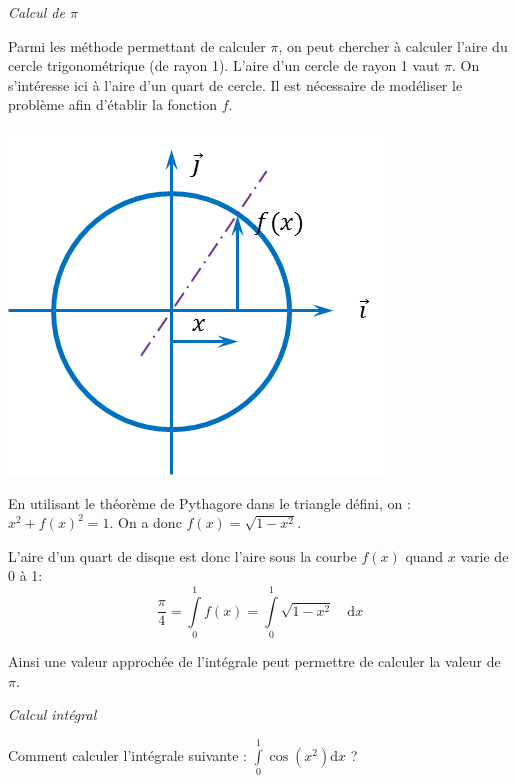 \documentclass[10pt]{article}
\begin{document}
\begin{exemple}
\textit{Calcul de $\pi$}

\begin{minipage}[c]{.6\linewidth}
Parmi les méthode permettant de calculer $\pi$, on peut chercher à calculer l'aire du cercle trigonométrique (de rayon 1). L'aire d'un cercle de rayon 1 vaut $\pi$. On s'intéresse ici à l'aire d'un quart de cercle. Il est nécessaire de modéliser le problème afin d'établir la fonction $f$.

\end{minipage}\hfill
\begin{minipage}[c]{.35\linewidth}
\begin{center}
\includegraphics[width=.95\textwidth]{images/cercle}
\end{center}
\end{minipage}

En utilisant le théorème de Pythagore dans le triangle défini, on : $x^2 + f(x)^2 = 1$. On a donc $f(x)=\sqrt{1-x^2}$. 

L'aire d'un quart de disque est donc l'aire sous la courbe $f(x)$ quand $x$ varie de 0 à 1:
$$
\dfrac{\pi}{4}=\int\limits_{0}^1 f(x) =\int\limits_{0}^1\sqrt{1-x^2} \quad \mathrm{d} x
$$

Ainsi une valeur approchée de l'intégrale peut permettre de calculer la valeur de $\pi$.
\end{exemple}
 
\begin{exemple}
\textit{Calcul intégral}

Comment calculer l'intégrale suivante : $\int\limits_{0}^1 \cos \left(x^2\right) \mathrm{d} x$ ?
\end{exemple}
\end{document}
